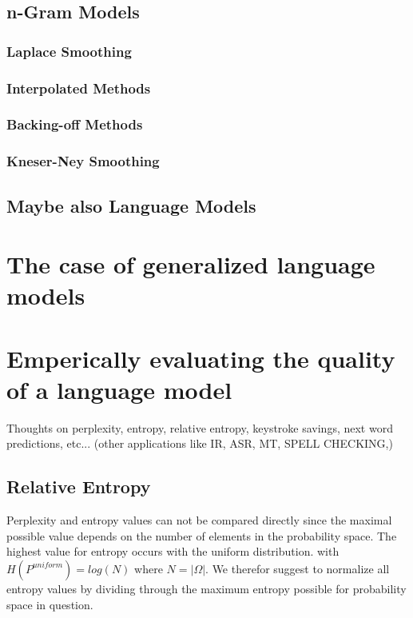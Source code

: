\documentclass[•]{book}
\begin{document}
\section{n-Gram Models}
\subsection{Laplace Smoothing}
\subsection{Interpolated Methods}
\subsection{Backing-off Methods}
\subsection{Kneser-Ney Smoothing}

\section{Maybe also Language Models}


\chapter{The case of generalized language models}

\chapter{Emperically evaluating the quality of a language model}
Thoughts on perplexity, entropy, relative entropy, keystroke savings, next word predictions, etc... (other applications like IR, ASR, MT, SPELL CHECKING,) 

\section{Relative Entropy}
Perplexity and entropy values can not be compared directly since the maximal possible value depends on the number of elements in the probability space.
The highest value for entropy occurs with the uniform distribution. with $H(P^{uniform})=log(N)$ where $N = |\Omega|$. 
We therefor suggest to normalize all entropy values by dividing through the maximum entropy possible for probability space in question. 
\end{document}
